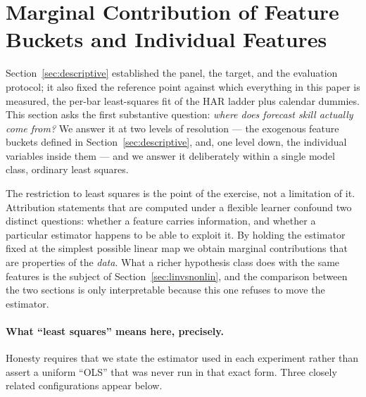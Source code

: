 \section{Marginal Contribution of Feature Buckets and Individual Features}\label{sec:marginal}

Section~\ref{sec:descriptive} established the panel, the target, and the evaluation
protocol; it also fixed the reference point against which everything in this paper is
measured, the per-bar least-squares fit of the HAR ladder plus calendar dummies. This
section asks the first substantive question: \emph{where does forecast skill actually come
from?} We answer it at two levels of resolution --- the exogenous feature buckets defined
in Section~\ref{sec:descriptive}, and, one level down, the individual variables inside them
--- and we answer it deliberately within a single model class, ordinary least squares.

The restriction to least squares is the point of the exercise, not a limitation of it.
Attribution statements that are computed under a flexible learner confound two distinct
questions: whether a feature carries information, and whether a particular estimator
happens to be able to exploit it. By holding the estimator fixed at the simplest possible
linear map we obtain marginal contributions that are properties of the \emph{data}. What a
richer hypothesis class does with the same features is the subject of
Section~\ref{sec:linvsnonlin}, and the comparison between the two sections is only
interpretable because this one refuses to move the estimator.

\paragraph{What ``least squares'' means here, precisely.} Honesty requires that we state
the estimator used in each experiment rather than assert a uniform ``OLS'' that was never
run in that exact form. Three closely related configurations appear below.

